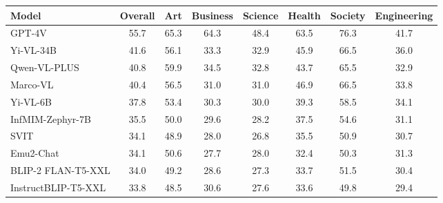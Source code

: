 \documentclass[numbers,sort&compress]{article}
\begin{document}
\begin{table}[t!]
\centering
\begin{tabular}{@{}lccccccc@{}}
\toprule
\textbf{Model}          & \textbf{Overall} & \textbf{Art} & \textbf{Business} & \textbf{Science} & \textbf{Health} & \textbf{Society} & \textbf{Engineering} \\ \midrule
GPT-4V & 55.7             & 65.3                   & 64.3              & 48.4             & 63.5                        & 76.3                         & 41.7                   \\
Yi-VL-34B               & 41.6             & 56.1                   & 33.3              & 32.9             & 45.9                        & 66.5                         & 36.0                   \\
Qwen-VL-PLUS            & 40.8             & 59.9                   & 34.5              & 32.8             & 43.7                        & 65.5                         & 32.9                   \\
Marco-VL                & 40.4             & 56.5                   & 31.0              & 31.0             & 46.9                        & 66.5                         & 33.8                   \\
Yi-VL-6B                & 37.8             & 53.4                   & 30.3              & 30.0             & 39.3                        & 58.5                         & 34.1                   \\
InfMIM-Zephyr-7B        & 35.5             & 50.0                   & 29.6              & 28.2             & 37.5                        & 54.6                         & 31.1                   \\
SVIT                    & 34.1             & 48.9                   & 28.0              & 26.8             & 35.5                        & 50.9                         & 30.7                   \\
Emu2-Chat               & 34.1             & 50.6                   & 27.7              & 28.0             & 32.4                        & 50.3                         & 31.3                   \\
BLIP-2 FLAN-T5-XXL       & 34.0             & 49.2                   & 28.6              & 27.3             & 33.7                        & 51.5                         & 30.4                   \\
InstructBLIP-T5-XXL      & 33.8             & 48.5                   & 30.6              & 27.6             & 33.6                        & 49.8                         & 29.4                   \\

\end{tabular}
\end{table}
\end{document}

